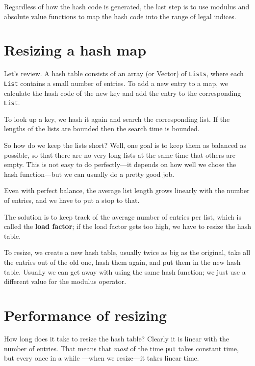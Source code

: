\documentclass[12pt]{book}
\theoremstyle{exercise}
\begin{document}
Regardless of how the hash code is generated, the last step
is to use modulus and absolute value functions to map the hash code
into the range of legal indices.


\section{Resizing a hash map}

Let's review.  A hash table consists of an array (or Vector)
of {\tt Lists}, where each {\tt List} contains a small number
of entries.  To add a new entry to a map, we calculate
the hash code of the new key and add the entry to the
corresponding {\tt List}.

To look up a key, we hash it again and search the corresponding list.
If the lengths of the lists are bounded then the search time is
bounded.

So how do we keep the lists short?  Well, one goal is to keep
them as balanced as possible, so that there are no very long
lists at the same time that others are empty.
This is not easy to do perfectly---it depends on how well we
chose the hash function---but we can usually do a pretty good
job.

Even with perfect balance, the average list length
grows linearly with the number of entries, and we have to put
a stop to that.

The solution is to keep track of the average number of entries
per list, which is called the {\bf load factor};
if the load factor gets too high, we have to resize the hash table.


To resize, we create a new hash table, usually twice as big as the
original, take all the entries out of the old one, hash them again,
and put them in the new hash table.  Usually we can get away with
using the same hash function; we just use a different value for the
modulus operator.


\section{Performance of resizing}

How long does it take to resize the hash table?  Clearly it is linear
with the number of entries.  That means that {\em most} of the
time {\tt put} takes constant time, but every once in a while
---when we resize---it takes linear time.
\end{document}
